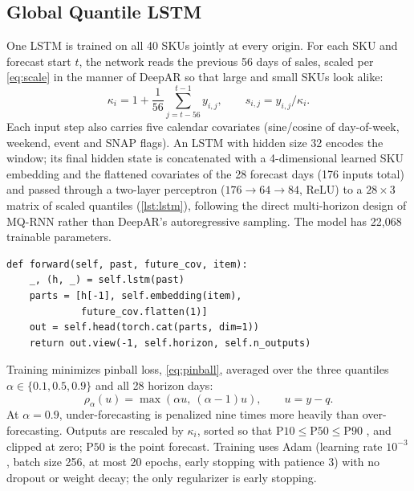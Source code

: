 \documentclass[conference]{IEEEtran}
\begin{document}
\subsection{Global Quantile LSTM}
\label{sec:lstm}
One LSTM \cite{hochreiter1997} is trained on all 40 SKUs jointly at every origin. For each SKU and
forecast start $t$, the network reads the previous 56 days of sales, scaled per \cref{eq:scale} in
the manner of DeepAR \cite{salinas2020} so that large and small SKUs look alike:
\begin{equation}
  \kappa_i = 1+\frac{1}{56}\sum_{j=t-56}^{t-1} y_{i,j}, \qquad s_{i,j} = y_{i,j}/\kappa_i .
  \label{eq:scale}
\end{equation}
Each input step also carries five calendar covariates (sine/cosine of day-of-week, weekend, event
and SNAP flags). An LSTM with hidden size 32 encodes the window; its final hidden state is
concatenated with a 4-dimensional learned SKU embedding and the flattened covariates of the 28
forecast days (176 inputs total) and passed through a two-layer perceptron
($176\to64\to84$, ReLU) to a $28\times3$ matrix of scaled quantiles (\cref{lst:lstm}), following the
direct multi-horizon design of MQ-RNN \cite{wen2017} rather than DeepAR's autoregressive sampling.
The model has 22{,}068 trainable parameters.

\begin{lstlisting}[caption={Forward pass (\texttt{global\_model.py}).},label={lst:lstm},float=t]
def forward(self, past, future_cov, item):
    _, (h, _) = self.lstm(past)
    parts = [h[-1], self.embedding(item),
             future_cov.flatten(1)]
    out = self.head(torch.cat(parts, dim=1))
    return out.view(-1, self.horizon, self.n_outputs)
\end{lstlisting}

Training minimizes pinball loss, \cref{eq:pinball}, averaged over the three quantiles
$\alpha\in\{0.1,0.5,0.9\}$ and all 28 horizon days:
\begin{equation}
  \rho_\alpha(u) = \max(\alpha u,\ (\alpha-1)u), \qquad u = y-q .
  \label{eq:pinball}
\end{equation}
At $\alpha=0.9$, under-forecasting is penalized nine times more heavily than over-forecasting.
Outputs are rescaled by $\kappa_i$, sorted so that $\mathrm{P10}\le\mathrm{P50}\le\mathrm{P90}$
\cite{chernozhukov2010}, and clipped at zero; $\mathrm{P50}$ is the point forecast. Training uses
Adam \cite{kingma2015} (learning rate $10^{-3}$, batch size 256, at most 20 epochs, early stopping
with patience 3) with no dropout or weight decay; the only regularizer is early stopping.
\end{document}
